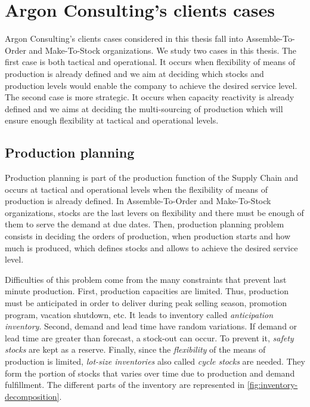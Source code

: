 

\section{Argon Consulting's clients cases}


Argon Consulting's clients cases considered in this thesis fall into Assemble-To-Order and Make-To-Stock organizations.
We study two cases in this thesis.
The first case is both tactical and operational.
It occurs when flexibility of means of production is already defined and we aim at deciding which stocks and production levels would enable the company to achieve the desired service level.
The second case is more strategic.
It occurs when capacity reactivity is already defined and we aims at deciding the multi-sourcing of production which will ensure enough flexibility at tactical and operational levels.


\subsection{Production planning}
\label{sec:business-context:argon:pdp}


Production planning is part of the production function of the Supply Chain and occurs at tactical and operational levels when the flexibility of means of production is already defined.
In Assemble-To-Order and Make-To-Stock organizations, stocks are the last levers on flexibility and there must be enough of them to serve the demand at due dates.
Then, production planning problem consists in deciding the orders of production, \ie when production starts and how much is produced, which defines stocks and allows to achieve the desired service level.


Difficulties of this problem come from the many constraints that prevent last minute production.
First, production capacities are limited.
Thus, production must be anticipated in order to deliver during peak selling season, promotion program, vacation shutdown, etc.
It leads to inventory called \emph{anticipation inventory}.
Second, demand and lead time have random variations.
If demand or lead time are greater than forecast, a stock-out can occur.
To prevent it, \emph{safety stocks} are kept as a reserve.
Finally, since the \emph{flexibility} of the means of production is limited, \emph{lot-size inventories} also called \emph{cycle stocks} are needed.
They form the portion of stocks that varies over time due to production and demand fulfillment.
The different parts of the inventory are represented in \cref{fig:inventory-decomposition}.


